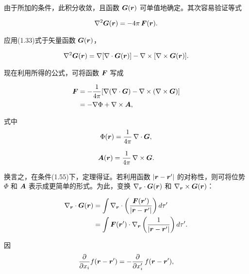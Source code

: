 由于所加的条件，此积分收敛，且函数 $\bm{G}(\bm{r})$ 可单值地确定。其次容易验证等式

\begin{equation*}
\nabla^{2}\bm{G}(\bm{r}) = -4\pi\, \bm{F}(\bm{r}).
\end{equation*}

应用(1.33)式于矢量函数 $\bm{G}(\bm{r})$，

\begin{equation*}
\nabla^{2}\bm{G}(\bm{r}) = \nabla[\nabla \cdot \bm{G}(\bm{r})] - \nabla \times [\nabla \times \bm{G}(\bm{r})].
\end{equation*}

现在利用所得的公式，可将函数 $\bm{F}$ 写成

\begin{equation*}
\begin{aligned}
\bm{F} &= -\frac{1}{4\pi} [\nabla(\nabla \cdot \bm{G}) - \nabla \times (\nabla \times \bm{G})]\\
&= -\nabla\Phi + \nabla \times \bm{A},
\end{aligned}
\end{equation*}

式中
\begin{equation*}
\Phi(\bm{r}) = \frac{1}{4\pi}\, \nabla \cdot \bm{G},
\end{equation*}

\begin{equation*}
\bm{A}(\bm{r}) = \frac{1}{4\pi}\, \nabla \times \bm{G}.
\end{equation*}

换言之，在条件(1.55)下，定理得证。若利用函数 $|\bm{r} - \bm{r}'|$ 的对称性，则可将位势 $\Phi$ 和 $\bm{A}$ 表示成更简单的形式。为此，变换 $\nabla_{\bm{r}} \cdot \bm{G}(\bm{r})$ 和 $\nabla_{\bm{r}} \times \bm{G}(\bm{r})$：

\begin{equation*}
\begin{aligned}
\nabla_{\bm{r}} \cdot \bm{G}(\bm{r}) &= \int \nabla_{\bm{r}} \cdot \left(\frac{\bm{F}(\bm{r}')}{|\bm{r} - \bm{r}'|}\right) d\tau'\\
&= \int \bm{F}(\bm{r}') \cdot \nabla_{\bm{r}} \left(\frac{1}{|\bm{r} - \bm{r}'|}\right) d\tau'.
\end{aligned}
\end{equation*}

因
\begin{equation*}
\frac{\partial}{\partial x_i} f(\bm{r} - \bm{r}') = -\frac{\partial}{\partial x_i'}\, f(\bm{r} - \bm{r}'),
\end{equation*}

